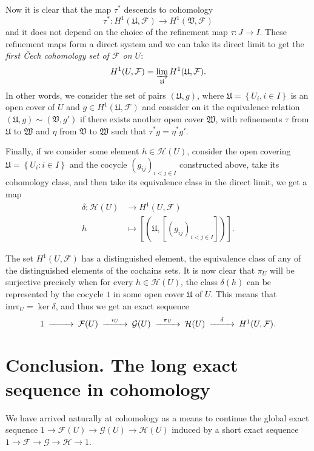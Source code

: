 \documentclass[12pt,a4paper]{article}
\begin{document}
	Now it is clear that the map $\tau^*$ descends to cohomology
	\begin{equation*}
	  \tau^*: H^1(\mathfrak{U},\mathcal{F})\rightarrow H^1(\mathfrak{V},\mathcal{F})
	\end{equation*}
	and it does not depend on the choice of the refinement map $\tau:J \rightarrow I$. These refinement maps form a direct system and we can take its direct limit to get the \emph{first \v{C}ech cohomology set of $\mathcal{F}$ on $U$}:
	\begin{equation*}
	  H^1(U,\mathcal{F})=\varinjlim_{\mathfrak{U}} H^1(\mathfrak{U},\mathcal{F}).
	\end{equation*}
	In other words, we consider the set of pairs $(\mathfrak{U},g)$, where $\mathfrak{U}=\left\{ U_i,i\in I \right\}$ is an open cover of $U$ and $g\in H^1(\mathfrak{U},\mathcal{F})$ and consider on it the equivalence relation $(\mathfrak{U},g)\sim (\mathfrak{V},g')$ if there exists another open cover $\mathfrak{W}$, with refinements $\tau$ from $\mathfrak{U}$ to $\mathfrak{W}$ and $\eta$ from $\mathfrak{V}$ to $\mathfrak{W}$ such that $\tau^*g=\eta^*g'$.

	Finally, if we consider some element $h\in \mathcal{H}(U)$, consider the open covering $\mathfrak{U}=\left\{ U_i:i\in I \right\}$ and the cocycle $(g_{ij})_{i<j\in I}$ constructed above, take its cohomology class, and then take its equivalence class in the direct limit, we get a map
	\begin{align*}
	  \delta:\mathcal{H}(U)&\longrightarrow H^1(U,\mathcal{F})\\ 
	  h &\longmapsto [(\mathfrak{U},[(g_{ij})_{i<j\in I}])]. 
	  \end{align*}

	  The set $H^1(U,\mathcal{F})$ has a distinguished element, the equivalence class of any of the distinguished elements of the cochains sets. It is now clear that $\pi_U$ will be surjective precisely when for every $h\in \mathcal{H}(U)$, the class $\delta(h)$ can be represented by the cocycle $1$ in some open cover $\mathfrak{U}$ of $U$. This means that $\mathrm{im} \pi_U=\ker \delta$, and thus we get an exact sequence
	  \begin{equation*}
      \begin{CD}
	1 @>>>	\mathcal{F}(U) @> i_U >> \mathcal{G}(U) @> \pi_U >> \mathcal{H}(U) @>\delta >> H^1(U,\mathcal{F}).
      \end{CD}
	  \end{equation*}

	  \section*{Conclusion. The long exact sequence in cohomology}
	  We have arrived naturally at cohomology as a means to continue the global exact sequence $1\rightarrow \mathcal{F}(U) \rightarrow \mathcal{G}(U) \rightarrow \mathcal{H}(U)$ induced by a short exact sequence $1\rightarrow \mathcal{F} \rightarrow \mathcal{G} \rightarrow \mathcal{H}\rightarrow 1$.
\end{document}
